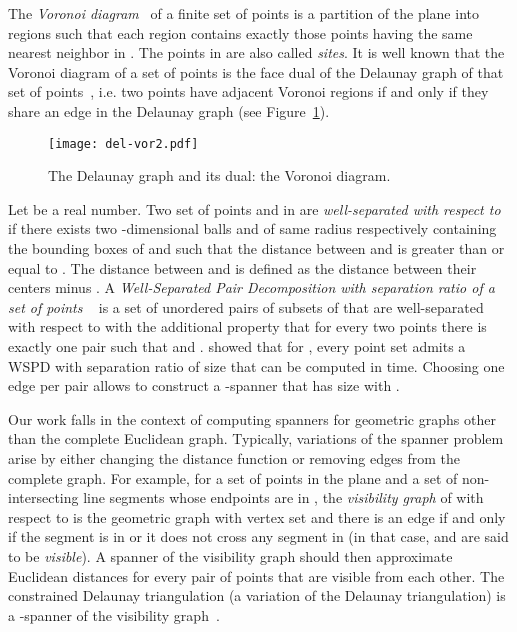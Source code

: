\documentclass[pdftex,leqno,fleqn,12pt]{article}
\begin{document}
The \emph{Voronoi diagram}~\cite{deberg97} of a finite set of points  is
a partition of the plane into  regions such that each region contains
exactly those points having the same nearest neighbor in . The points in
 are also called \emph{sites}.  It is well known that the Voronoi diagram
of a set of points is the face dual of the Delaunay graph of that set of
points~\cite{deberg97}, i.e. two points have adjacent Voronoi regions if and
only if they share an edge in the Delaunay graph (see
Figure~\ref{fig-vor-del}).

\begin{figure}
\centering
\texttt{[image: del-vor2.pdf]}
\caption{The Delaunay graph and its dual: the Voronoi diagram.}\label{fig-vor-del}
\end{figure}

Let  be a real number. Two set of points  and  in  are
\emph{well-separated with respect to } if there exists two -dimensional
balls  and  of same radius  respectively containing the bounding
boxes of  and  such that the distance between  and  is greater
than or equal to . The distance between  and  is defined
as the distance between their centers minus . A \emph{Well-Separated
Pair Decomposition with separation ratio  of a set of points
}~\cite{callahan95,smid07} is a set of unordered pairs
 of subsets of  that are well-separated
with respect to  with the additional property that for every two points
 there is exactly one pair  such that  and
. \citet{callahan95} showed that for , every point set admits a
WSPD with separation ratio  of  size that can be computed in  time. Choosing one edge per pair allows to construct a -spanner that has
 size with .

Our work falls in the context of computing spanners for geometric graphs other than the complete
Euclidean graph. Typically, variations of the spanner problem arise by either changing the distance
function or removing edges from the complete graph. For example, for a set  of points in the
plane and a set  of non-intersecting line segments whose endpoints are in , the
\emph{visibility graph} of  with respect to  is the geometric graph with vertex set  and
there is an edge  if and only if the segment  is in  or it does not cross
any segment in  (in that case,  and  are said to be \emph{visible}). A spanner of the
visibility graph should then approximate Euclidean distances for every pair of points that are
visible from each other. The constrained Delaunay triangulation (a variation of the Delaunay
triangulation) is a -spanner of the visibility graph~\cite{ioannis01, klein06, bose06}.
\end{document}
